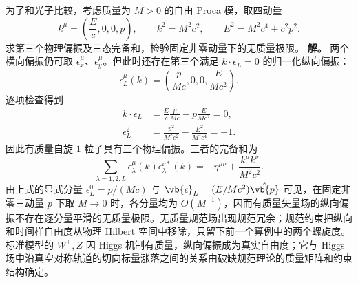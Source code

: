 \begin{exbox}[有质量矢量场为什么多一个纵向偏振]
为了和光子比较，考虑质量为 $M>0$ 的自由 Proca 模，取四动量
\begin{equation*}
 k^\mu=\left(\frac Ec,0,0,p\right),
 \qquad
 k^2=M^2c^2,
 \qquad
 E^2=M^2c^4+c^2p^2.
\end{equation*}
求第三个物理偏振及三态完备和，检验固定非零动量下的无质量极限。
\textbf{解。} 两个横向偏振仍可取 $\epsilon_x^\mu$、$\epsilon_y^\mu$。但此时还存在第三个满足 $k\cdot\epsilon_L=0$ 的归一化纵向偏振：
\begin{equation}
 {
 \epsilon_L^\mu(k)
 =\left(\frac{p}{Mc},0,0,\frac{E}{Mc^2}\right).}
 \label{eq:massive-vector-longitudinal-polarization-dp62}
\end{equation}
逐项检查得到
\begin{align*}
 k\cdot\epsilon_L
 &=\frac Ec\frac{p}{Mc}-p\frac{E}{Mc^2}=0,\\
 \epsilon_L^2
 &=\frac{p^2}{M^2c^2}-\frac{E^2}{M^2c^4}=-1.
\end{align*}
因此有质量自旋 $1$ 粒子具有三个物理偏振。三者的完备和为
\begin{equation}
 {
 \sum_{\lambda=1,2,L}
 \epsilon_\lambda^\mu(k)\epsilon_\lambda^{\nu *}(k)
 =-\eta^{\mu\nu}+\frac{k^\mu k^\nu}{M^2c^2}.}
 \label{eq:massive-vector-polarization-sum-dp62}
\end{equation}
由上式的显式分量 $\epsilon_L^0=p/(Mc)$ 与 $\vb{\epsilon}_L=(E/Mc^2)\hat{\vb{p}}$ 可见，在固定非零三动量 $p$ 下取 $M\to0$ 时，各分量均为 $O(M^{-1})$，因而有质量矢量场的纵向偏振不存在逐分量平滑的无质量极限。无质量规范场出现规范冗余；规范约束把纵向和时间样自由度从物理 Hilbert 空间中移除，只留下前一个算例中的两个螺旋度。标准模型的 $W^\pm,Z$ 因 Higgs 机制有质量，纵向偏振成为真实自由度；它与 Higgs 场中沿真空对称轨道的切向标量涨落之间的关系由破缺规范理论的质量矩阵和约束结构确定。
\end{exbox}
